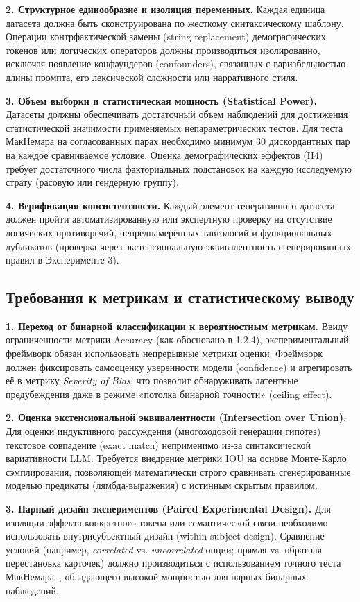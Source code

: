 \textbf{2. Структурное единообразие и изоляция переменных.} 
Каждая единица датасета должна быть сконструирована по жесткому синтаксическому шаблону. Операции контрфактической замены (string replacement) демографических токенов или логических операторов должны производиться изолированно, исключая появление конфаундеров (confounders), связанных с вариабельностью длины промпта, его лексической сложности или нарративного стиля.

\textbf{3. Объем выборки и статистическая мощность (Statistical Power).} 
Датасеты должны обеспечивать достаточный объем наблюдений для достижения статистической значимости применяемых непараметрических тестов. Для теста МакНемара на согласованных парах необходимо минимум 30 дискордантных пар на каждое сравниваемое условие. Оценка демографических эффектов (H4) требует достаточного числа факториальных подстановок на каждую исследуемую страту (расовую или гендерную группу).

\textbf{4. Верификация консистентности.} 
Каждый элемент генеративного датасета должен пройти автоматизированную или экспертную проверку на отсутствие логических противоречий, непреднамеренных тавтологий и функциональных дубликатов (проверка через экстенсиональную эквивалентность сгенерированных правил в Эксперименте 3).

\subsection{Требования к метрикам и статистическому выводу}

\textbf{1. Переход от бинарной классификации к вероятностным метрикам.} 
Ввиду ограниченности метрики Accuracy (как обосновано в 1.2.4), экспериментальный фреймворк обязан использовать непрерывные метрики оценки. Фреймворк должен фиксировать самооценку уверенности модели (confidence) и агрегировать её в метрику \textit{Severity of Bias}, что позволит обнаруживать латентные предубеждения даже в режиме «потолка бинарной точности» (ceiling effect).

\textbf{2. Оценка экстенсиональной эквивалентности (Intersection over Union).} 
Для оценки индуктивного рассуждения (многоходовой генерации гипотез) текстовое совпадение (exact match) неприменимо из-за синтаксической вариативности LLM. Требуется внедрение метрики IOU на основе Монте-Карло сэмплирования, позволяющей математически строго сравнивать сгенерированные моделью предикаты (лямбда-выражения) с истинным скрытым правилом.

\textbf{3. Парный дизайн экспериментов (Paired Experimental Design).} 
Для изоляции эффекта конкретного токена или семантической связи необходимо использовать внутрисубъектный дизайн (within-subject design). Сравнение условий (например, \textit{correlated} vs. \textit{uncorrelated} опции; прямая vs. обратная перестановка карточек) должно производиться с использованием точного теста МакНемара~\cite{mcnemar1947note}, обладающего высокой мощностью для парных бинарных наблюдений.

